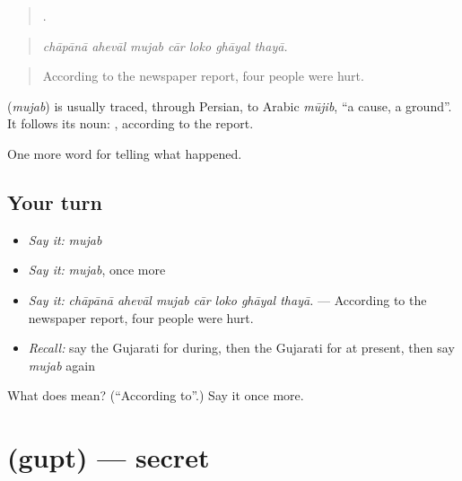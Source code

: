 \begin{quote}
      .
\end{quote}

\begin{quote}
\emph{chāpānā ahevāl mujab cār loko ghāyal thayā.}
\end{quote}

\begin{quote}
According to the newspaper report, four people were hurt.
\end{quote}

\begin{cousinweb}
\textbf{} (\emph{mujab}) is usually traced, through Persian, to Arabic \emph{mūjib}, \textquotedblleft{}a cause, a ground\textquotedblright{}. It follows its noun: \textbf{ }, according to the report.
\end{cousinweb}

\begin{grammarlens}[title={What you've built}]
One more word for telling what happened.
\end{grammarlens}

\subsection*{Your turn}
\begin{itemize}
\raggedright
  \item \emph{Say it:} \emph{mujab}
  \item \emph{Say it:} \emph{mujab}, once more
  \item \emph{Say it:} \emph{chāpānā ahevāl mujab cār loko ghāyal thayā.} — According to the newspaper report, four people were hurt.
  \item \emph{Recall:} say the Gujarati for during, then the Gujarati for at present, then say \emph{mujab} again
\end{itemize}

\begin{tcolorbox}[breakable,colback=teal!4,colframe=teal!35!black,title={Before you move on}]
What does  mean? (\textquotedblleft{}According to\textquotedblright{}.) Say it once more.
\end{tcolorbox}
\section[\texorpdfstring{\gu{ગુપ્ત} (gupt)}{ગુપ્ત (gupt)}]{ (gupt) — secret}

